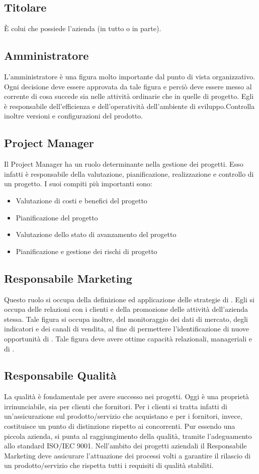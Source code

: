 	\subsection{Titolare}
	È colui che possiede l'azienda (in tutto o in parte).
	\subsection{Amministratore}		
	L'amministratore è una figura molto importante dal punto di vista organizzativo. Ogni decisione deve essere approvata da 	tale figura e perciò deve essere messo al corrente di cosa succede sia nelle attività ordinarie che in quelle di progetto.
	Egli è responsabile dell'efficienza e dell'operatività dell'ambiente di sviluppo.Controlla inoltre versioni e configurazioni del prodotto.
	\subsection{Project Manager}
	Il Project Manager ha un ruolo determinante nella gestione dei progetti. Esso infatti è responsabile della valutazione, pianificazione, realizzazione e controllo di un progetto.
	I suoi compiti più importanti sono:
	\begin{itemize}
		\item Valutazione di costi e benefici del progetto
		\item Pianificazione del progetto
		\item Valutazione dello stato di avanzamento del progetto
		\item Pianificazione e gestione dei rischi di progetto
	\end{itemize}
	\subsection{Responsabile Marketing}
	Questo ruolo si occupa della definizione ed applicazione delle strategie di . Egli si occupa delle relazioni con i clienti e della promozione delle attività dell'azienda stessa. Tale figura si occupa inoltre, del monitoraggio dei dati di mercato, degli indicatori e dei canali di vendita, al fine di permettere l'identificazione di nuove opportunità di .
	Tale figura deve avere ottime capacità relazionali, manageriali e di . 
\subsection{Responsabile Qualità}	
	La qualità è fondamentale per avere successo nei progetti. Oggi è una proprietà irrinunciabile, sia per clienti che fornitori. Per i clienti si tratta infatti di un'assicurazione sul prodotto/servizio che acquistano e per i fornitori, invece, costituisce  un punto di distinzione rispetto ai concorrenti.
Pur essendo una piccola azienda, si punta al raggiungimento della qualità, tramite l'adeguamento allo standard ISO/IEC 9001.
Nell'ambito dei progetti aziendali il Responsabile Marketing deve assicurare l'attuazione dei processi volti a garantire il rilascio di un prodotto/servizio che rispetta tutti i requisiti di qualità stabiliti.
	 
